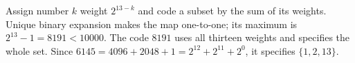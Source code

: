 Assign number $k$ weight $2^{13-k}$ and code a subset by the sum of its weights. Unique binary expansion makes the map one-to-one; its maximum is $2^{13}-1=8191<10000$. The code $8191$ uses all thirteen weights and specifies the whole set. Since $6145=4096+2048+1=2^{12}+2^{11}+2^0$, it specifies $\boxed{\{1,2,13\}}$.
